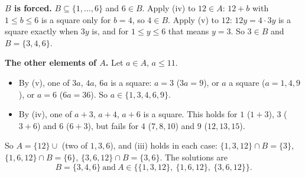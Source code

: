 \textbf{$B$ is forced.} $B\subseteq\{1,\dots,6\}$ and $6\in B$. Apply (iv) to $12\in A$: $12+b$ with $1\le b\le6$ is a square only for $b=4$, so $4\in B$. Apply (v) to $12$: $12y=4\cdot3y$ is a square exactly when $3y$ is, and for $1\le y\le6$ that means $y=3$. So $3\in B$ and $B=\{3,4,6\}$.

\textbf{The other elements of $A$.} Let $a\in A$, $a\le11$.
\begin{itemize}
\item By (v), one of $3a$, $4a$, $6a$ is a square: $a=3$ ($3a=9$), or $a$ a square ($a=1,4,9$), or $a=6$ ($6a=36$). So $a\in\{1,3,4,6,9\}$.
\item By (iv), one of $a+3$, $a+4$, $a+6$ is a square. This holds for $1$ ($1+3$), $3$ ($3+6$) and $6$ ($6+3$), but fails for $4$ ($7,8,10$) and $9$ ($12,13,15$).
\end{itemize}
So $A=\{12\}\cup$ (two of $1,3,6$), and (iii) holds in each case: $\{1,3,12\}\cap B=\{3\}$, $\{1,6,12\}\cap B=\{6\}$, $\{3,6,12\}\cap B=\{3,6\}$. The solutions are
\[\boxed{B=\{3,4,6\}\ \text{and}\ A\in\bigl\{\{1,3,12\},\ \{1,6,12\},\ \{3,6,12\}\bigr\}}.\]
